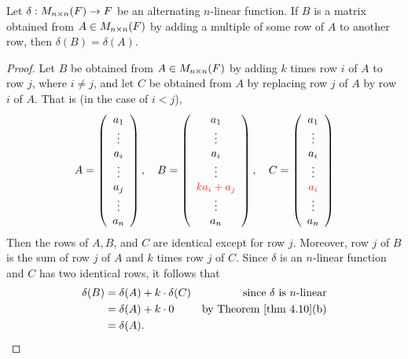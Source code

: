 \begin{corollary} \label{corollary 4.10.1}
Let \(\delta: M_{n \times n}(F) \to F\) be an alternating \(n\)-linear function.
If \(B\) is a matrix obtained from \(A \in M_{n \times n}(F)\) by adding a multiple of some row of \(A\) to another row, then \(\delta(B) = \delta(A)\).
\end{corollary}

\begin{proof}
Let \(B\) be obtained from \(A \in M_{n \times n}(F)\) by adding \(k\) times row \(i\) of \(A\) to row \(j\), where \(i \ne j\), and let \(C\) be obtained from \(A\) by replacing row \(j\) of \(A\) by row \(i\) of \(A\).
That is (in the case of \(i < j\)),
\[
    A = \left(\begin{array}{c} a_1 \\ \vdots \\ a_i \\ \vdots \\ a_j \\ \vdots \\ a_n \end{array}\right), \quad
    B = \left(\begin{array}{c} a_1 \\ \vdots \\ a_i \\ \vdots \\ \RED{k a_i + a_j} \\ \vdots \\ a_n \end{array}\right), \quad
    C = \left(\begin{array}{c} a_1 \\ \vdots \\ a_i \\ \vdots \\ \RED{a_i} \\ \vdots \\ a_n \end{array}\right)
\]
Then the rows of \(A, B\), and \(C\) are identical except for row \(j\).
Moreover, row \(j\) of \(B\) is the sum of row \(j\) of \(A\) and \(k\) times row \(j\) of \(C\).
Since \(\delta\) is an \(n\)-linear function and \(C\) has two identical rows, it follows that
\begin{align*}
    \delta(B) & = \delta(A) + k \cdot \delta(C) & \text{since \(\delta\) is \(n\)-linear} \\
              & = \delta(A) + k \cdot 0 & \text{by \THM{4.10}(b)} \\
              & = \delta(A).
\end{align*}
\end{proof}

